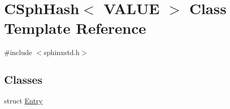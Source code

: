 \hypertarget{classCSphHash}{\section{C\-Sph\-Hash$<$ V\-A\-L\-U\-E $>$ Class Template Reference}
\label{classCSphHash}
}


{\ttfamily \#include $<$sphinxstd.\-h$>$}

\subsection*{Classes}
\begin{DoxyCompactItemize}
\item 
struct \hyperlink{structCSphHash_1_1Entry}{Entry}
\end{DoxyCompactItemize}
